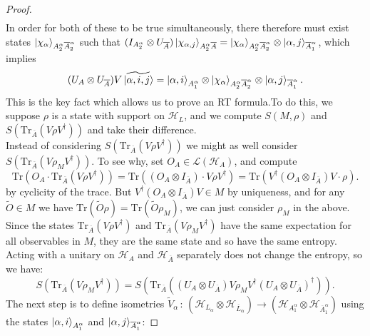 \documentclass[12pt,a4paper]{report}
\numberwithin{equation}{section}
\newcommand{\ol}[1]{\overline{#1}}
\theoremstyle{definition}
\theoremstyle{theorem}
\theoremstyle{theorem}
\theoremstyle{example}
\theoremstyle{definition}
\begin{document}
\begin{proof}
\begin{equation}
\begin{aligned}
		\end{aligned}
	\end{equation}
	In order for both of these to be true simultaneously, there therefore must exist states $\ket{\chi_{\alpha}}_{A_{2}^{\alpha}\ol{A}_{2}^{\alpha}}$ such that $(I_{A_{2}^{\alpha}}\otimes U_{\ol{A}})\ket{\chi_{\alpha,j}}_{A_{2}^{\alpha}\ol{A}}=\ket{\chi_{\alpha}}_{A_{2}^{\alpha}\ol{A}_{2}^{\alpha}}\otimes\ket{\alpha,j}_{\ol{A}_{1}^{\alpha}}$, which implies
	\begin{equation}\label{imp}
		(U_{A}\otimes U_{\ol{A}})V\ket{\widetilde{\alpha,i,j}}=\ket{\alpha,i}_{A_{1}^{\alpha}}\otimes\ket{\chi_{\alpha}}_{A_{2}^{\alpha}\ol{A}_{2}^{\alpha}}\otimes\ket{\alpha,j}_{\ol{A}_{1}^{\alpha}}.
	\end{equation}
	This is the key fact which allows us to prove an RT formula.To do this, we suppose $\rho$ is a state with support on $\mathcal{H}_{L}$, and we compute $S(M,\rho)$ and $S(\text{Tr}_{\ol{A}}(V\rho V^{\dagger}))$ and take their difference.\\
	Instead of considering $S(\text{Tr}_{\ol{A}}(V\rho V^{\dagger}))$ we might as well consider $S(\text{Tr}_{\ol{A}}(V\rho_{M} V^{\dagger}))$. To see why, set $O_{A}\in \mathcal{L}(\mathcal{H}_{A})$, and compute
	\begin{equation}
		\text{Tr}(O_{A}\cdot\text{Tr}_{\ol{A}}(V\rho V^{\dagger}))=\text{Tr}((O_{A}\otimes I_{\ol{A}})\cdot V\rho V^{\dagger})=\text{Tr}(V^{\dagger}(O_{A}\otimes I_{\ol{A}})V\cdot\rho).
	\end{equation}
	by cyclicity of the trace. But $V^{\dagger}(O_{A}\otimes I_{\ol{A}})V\in M$ by uniqueness, and for any $\tilde{O}\in M$ we have $\text{Tr}(\tilde{O}\rho)=\text{Tr}(\tilde{O}\rho_{M})$, we can just consider $\rho_{M}$ in the above. Since the states $\text{Tr}_{\ol{A}}(V\rho V^{\dagger})$ and $\text{Tr}_{\ol{A}}(V\rho_{M} V^{\dagger})$ have the same expectation for all observables in $M$, they are the same state and so have the same entropy. Acting with a unitary on $\mathcal{H}_{A}$ and $\mathcal{H}_{\ol{A}}$ separately does not change the entropy, so we have:
	\begin{equation}
		S(\text{Tr}_{\ol{A}}(V\rho_{M} V^{\dagger}))=S(\text{Tr}_{\ol{A}}((U_{A}\otimes U_{\ol{A}})V\rho_{M} V^{\dagger}(U_{A}\otimes U_{\ol{A}})^{\dagger})).
	\end{equation}
	The next step is to define isometries $\tilde{V}_{\alpha}\,:\,(\mathcal{H}_{L_{\alpha}}\otimes\mathcal{H}_{\ol{L}_{\alpha}})\to(\mathcal{H}_{A_{1}^{\alpha}}\otimes\mathcal{H}_{\ol{A}_{1}^{\alpha}})$ using the states $\ket{\alpha,i}_{A_{1}^{\alpha}}$ and $\ket{\alpha,j}_{\ol{A}_{1}^{\alpha}}$:

\end{proof}
\end{document}

